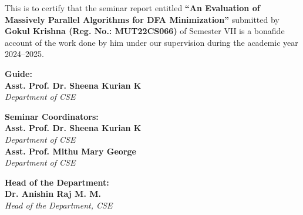 \documentclass[a4paper,12pt]{template}
\begin{document}
\noindent
This is to certify that the seminar report entitled \textbf{``An Evaluation of Massively Parallel Algorithms for DFA Minimization''} submitted by \textbf{Gokul Krishna (Reg. No.: MUT22CS066)} of Semester VII is a bonafide account of the work done by him under our supervision during the academic year 2024--2025.

\vspace{5cm}
\noindent
\begin{center}
\begin{minipage}[t]{0.3\textwidth}
    \textbf{Guide:}\\[0.2cm]
    \textbf{Asst. Prof. Dr. Sheena Kurian K}\\
    \textit{Department of CSE}
\end{minipage}%
\hfill
\begin{minipage}[t]{0.3\textwidth}
    \textbf{Seminar Coordinators:}\\[0.2cm]
    \textbf{Asst. Prof. Dr. Sheena Kurian K}\\
    \textit{Department of CSE}\\[0.4cm]
    \textbf{Asst. Prof. Mithu Mary George}\\
    \textit{Department of CSE}
\end{minipage}%
\hfill
\begin{minipage}[t]{0.3\textwidth}
    \textbf{Head of the Department:}\\[0.2cm]
    \textbf{Dr. Anishin Raj M. M.}\\
    \textit{Head of the Department, CSE}
\end{minipage}%
\end{center}

\newpage




\newpage
\tableofcontents

\newpage


\newpage
\begingroup
\makeatletter
\let\cleardoublepage\clearpage
\makeatother
{}
\listoffigures
\newpage
{}
\listoftables
\newpage
{}
{}

\endgroup
\end{document}

